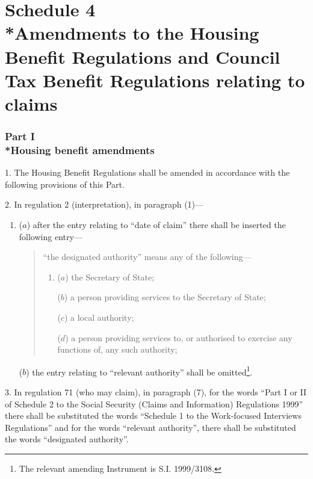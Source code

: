 \documentclass[12pt,a4paper]{article}
\begin{document}
\part[Schedule 4 --- Amendments to the Housing Benefit Regulations and Council Tax Benefit Regulations relating to claims]{Schedule 4\\*Amendments to the Housing Benefit Regulations and Council Tax Benefit Regulations relating to claims}

\section[Part I --- Housing benefit amendments]{Part I\\*Housing benefit amendments}

\renewcommand\parthead{--- Schedule 4 Part I}

1.  The Housing Benefit Regulations shall be amended in accordance with the following provisions of this Part.

\medskip

2.  In regulation 2 (interpretation), in paragraph (1)—
\begin{enumerate}\item[]
($a$) after the entry relating to “date of claim” there shall be inserted the following entry—
\begin{quotation}
    “the designated authority” means any of the following—
\begin{enumerate}\item[]
    ($a$) 
    the Secretary of State;

    ($b$) 
    a person providing services to the Secretary of State;

    ($c$) 
    a local authority;

    ($d$) 
    a person providing services to, or authorised to exercise any functions of, any such authority;
\end{enumerate}
\end{quotation}

    ($b$) 
    the entry relating to “relevant authority” shall be omitted\footnote{\frenchspacing The relevant amending Instrument is S.I. 1999/3108.\label{fn:18}}. 
\end{enumerate}

\medskip

3.  In regulation 71 (who may claim), in paragraph (7), for the words “Part I or II of Schedule 2 to the Social Security (Claims and Information) Regulations 1999” there shall be substituted the words “Schedule 1 to the Work-focused Interviews Regulations” and for the words “relevant authority”, there shall be substituted the words “designated authority”.
\end{document}
